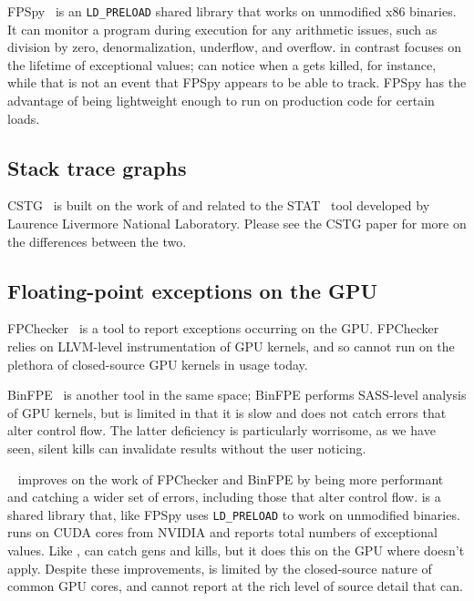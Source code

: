 \documentclass{juliacon}
\begin{document}
FPSpy~\cite{dindaSpyingFloatingPoint2020} is an \texttt{LD\_PRELOAD} shared library that works on unmodified x86 binaries.
It can monitor a program during execution for any \fp{} arithmetic issues, such as division by zero, denormalization, underflow, and overflow.
\FT{} in contrast focuses on the lifetime of exceptional values; \FT{} can notice when a \NaN{} gets killed, for instance, while that is not an event that FPSpy appears to be able to track.
FPSpy has the advantage of being lightweight enough to run on production code for certain loads.

\subsection{Stack trace graphs}

CSTG~\cite{humphreySystematicDebuggingMethods2014} is built on the work of and related to the STAT~\cite{arnoldStackTraceAnalysis2007} tool developed by Laurence Livermore National Laboratory.
Please see the CSTG paper for more on the differences between the two.

\subsection{Floating-point exceptions on the GPU}

FPChecker~\cite{l-ase-2019} is a tool to report \fp{} exceptions occurring on the GPU.
FPChecker relies on LLVM-level instrumentation of GPU kernels, and so cannot run on the plethora of closed-source GPU kernels in usage today.

BinFPE~\cite{llg-soap-2022} is another tool in the same space;
BinFPE performs SASS-level analysis of GPU kernels, but is limited in that it is slow and does not catch errors that alter control flow.
The latter deficiency is particularly worrisome, as we have seen, silent \NaN{} kills can invalidate results without the user noticing.

\GPUFPX{}~\cite{llsflg-hpdc-2023} improves on the work of FPChecker and BinFPE by being more performant and catching a wider set of errors, including those that alter control flow.
\GPUFPX{} is a shared library that, like FPSpy uses \texttt{LD\_PRELOAD} to work on unmodified binaries.
\GPUFPX{} runs on CUDA cores from NVIDIA and reports total numbers of exceptional values.
Like \FT{}, \GPUFPX{} can catch \NaN{} gens and kills, but it does this on the GPU where \FT{} doesn't apply.
Despite these improvements, \GPUFPX{} is limited by the closed-source nature of common GPU cores, and cannot report at the rich level of source detail that \FT{} can.
\end{document}
